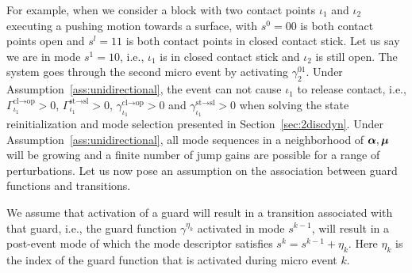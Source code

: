 \documentclass[../DC2017114Bouma.tex]{subfiles}
\begin{document}
For example, when we consider a block with two contact points $\iota_1$ and $\iota_2$ executing a pushing motion towards a surface, with $s^0 = 00$ is both contact points open and $s^l = 11$ is both contact points in closed contact stick. Let us say we are in mode $s^1 = 10$, i.e., $\iota_1$ is in closed contact stick and $\iota_2$ is still open. The system goes through the second micro event by activating $\gamma^{01}_2$. Under Assumption~\ref{ass:unidirectional}, the event can not cause $\iota_1$ to release contact, i.e., $\Gamma_{\iota_1}^{\text{cl}\rightarrow\text{op}}>0$, $\Gamma_{\iota_1}^{\text{st}\rightarrow\text{sl}}>0$, $\gamma_{\iota_1}^{\text{cl}\rightarrow\text{op}}>0$ and $\gamma_{\iota_1}^{\text{st}\rightarrow\text{sl}}>0$ when solving the state reinitialization and mode selection presented in Section~\ref{sec:2discdyn}. Under Assumption~\ref{ass:unidirectional}, all mode sequences in a neighborhood of $\boldsymbol{\alpha},\boldsymbol{\mu}$ will be growing and a finite number of jump gains are possible for a range of perturbations. Let us now pose an assumption on the association between guard functions and transitions.

\begin{sloppypar}
\begin{myass}\label{ass:guardtrans}
We assume that activation of a guard will result in a transition associated with that guard, i.e., the guard function $\gamma^{\eta_k}$ activated in mode $s^{k-1}$, will result in a post-event mode of which the mode descriptor satisfies $s^{k} = s^{k-1} + \eta_k$. Here $\eta_k$ is the index of the guard function that is activated during micro event $k$.
\end{myass}
\end{sloppypar}
\end{document}
